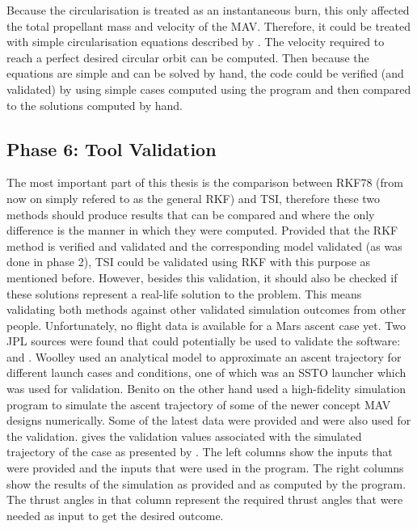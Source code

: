 \noindent
Because the circularisation is treated as an instantaneous burn, this only affected the total propellant mass and velocity of the \ac{MAV}. Therefore, it could be treated with simple circularisation equations described by \cite{wakker2010}. The velocity required to reach a perfect desired circular orbit can be computed. Then because the equations are simple and can be solved by hand, the code could be verified (and validated) by using simple cases computed using the program and then compared to the solutions computed by hand. 

\subsection{Phase 6: Tool Validation}
\label{subsec:phase6com}
The most important part of this thesis is the comparison between \ac{RKF78} (from now on simply refered to as the general \ac{RKF}) and \ac{TSI}, therefore these two methods should produce results that can be compared and where the only difference is the manner in which they were computed. Provided that the \ac{RKF} method is verified and validated and the corresponding model validated (as was done in phase 2), \ac{TSI} could be validated using \ac{RKF} with this purpose as mentioned before. However, besides this validation, it should also be checked if these solutions represent a real-life solution to the problem. This means validating both methods against other validated simulation outcomes from other people. Unfortunately, no flight data is available for a Mars ascent case yet. Two \ac{JPL} sources were found that could potentially be used to validate the software: \cite{woolley2015simple} and \cite{benito2016trajectory}. Woolley used an analytical model to approximate an ascent trajectory for different launch cases and conditions, one of which was an \ac{SSTO} launcher which was used for validation. Benito on the other hand used a high-fidelity simulation program to simulate the ascent trajectory of some of the newer concept \ac{MAV} designs numerically. Some of the latest data were provided and were also used for the validation.  gives the validation values associated with the simulated trajectory of the case as presented by \cite{woolley2015simple}. The left columns show the inputs that were provided and the inputs that were used in the program. The right columns show the results of the simulation as provided and as computed by the program. The thrust angles in that column represent the required thrust angles that were needed as input to get the desired outcome.


